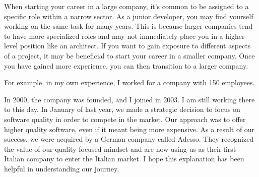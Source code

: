 When starting your career in a large company, it's common to be assigned
to a specific role within a narrow sector. As a junior developer, you
may find yourself working on the same task for many years. This is
because larger companies tend to have more specialized roles and may not
immediately place you in a higher-level position like an architect. If
you want to gain exposure to different aspects of a project, it may be
beneficial to start your career in a smaller company. Once you have
gained more experience, you can then transition to a larger company.

For example, in my own experience, I worked for a company with 150
employees.

In 2000, the company was founded, and I joined in 2003. I am still
working there to this day. In January of last year, we made a strategic
decision to focus on software quality in order to compete in the market.
Our approach was to offer higher quality software, even if it meant
being more expensive. As a result of our success, we were acquired by a
German company called Adesso. They recognized the value of our
quality-focused mindset and are now using us as their first Italian
company to enter the Italian market. I hope this explanation has been
helpful in understanding our journey.
